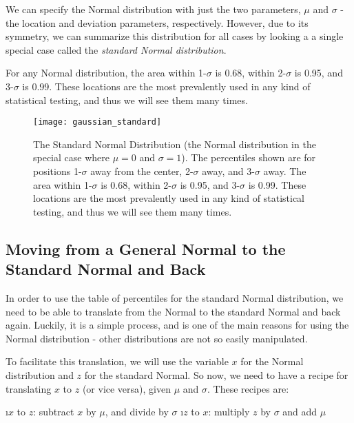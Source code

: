 We can specify the Normal distribution with just the two parameters, $\mu$ and $\sigma$ - the location and deviation parameters, respectively.  However, due to its symmetry, we can summarize this distribution for all cases by looking a a single special case called the {\em standard Normal distribution}.  

For any Normal distribution, the area within 1-$\sigma$ is 0.68, within 2-$\sigma$ is 0.95, and 3-$\sigma$ is 0.99.  These locations are the most prevalently used in any kind of statistical testing, and thus we will see them many times.   

\begin{figure}
\texttt{[image: gaussian\_standard]}
\caption{The Standard Normal Distribution (the Normal distribution in the special case where $\mu=0$  and $\sigma=1$).  The percentiles shown are for positions 1-$\sigma$ away from the center, 2-$\sigma$ away, and 3-$\sigma$ away.  The area within 1-$\sigma$ is 0.68, within 2-$\sigma$ is 0.95, and 3-$\sigma$ is 0.99.  These locations are the most prevalently used in any kind of statistical testing, and thus we will see them many times.}
\label{fig:gaussian_sigma2}
\end{figure}

\subsection{Moving from a General Normal to the Standard Normal and Back}

In order to use the table of percentiles for the standard Normal distribution, we need to be able to translate from the Normal to the standard Normal and back again.  Luckily, it is a simple process, and is one of the main reasons for using the Normal distribution - other distributions are not so easily manipulated.

To facilitate this translation, we will use the variable $x$ for the Normal distribution and $z$ for the standard Normal.  So now, we need to have a recipe for translating $x$ to $z$ (or vice versa), given $\mu$ and $\sigma$.  These recipes are:

\be
\i $x$ to $z$:  subtract $x$ by $\mu$, and divide by $\sigma$
\i $z$ to $x$:  multiply $z$ by $\sigma$ and add $\mu$
\ee

